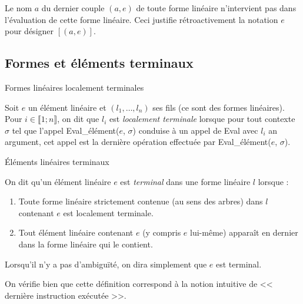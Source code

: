 \begin{remark}
    \label{justification_notation_forme_lineaire_simple}
    Le nom $a$ du dernier couple $(a, e)$ de toute forme linéaire
    n'intervient pas dans l'évaluation de cette forme linéaire. Ceci justifie
    rétroactivement la notation $e$ pour désigner $[(a, e)]$.
\end{remark}

\subsection{Formes et éléments terminaux}

\begin{definition}
    Formes linéaires localement terminales

    Soit $e$ un élément linéaire et $(l_1, \ldots, l_n)$ ses fils (ce
    sont des formes linéaires). Pour $i \in \lBrack 1; n \rBrack$, on dit que
    $l_i$ est \textit{localement terminale} lorsque pour tout contexte $\sigma$
    tel que l'appel Eval\_élément($e$, $\sigma$) conduise à un appel de Eval
    avec $l_i$ an argument, cet appel est la dernière opération effectuée par
    Eval\_élément($e$, $\sigma$).
\end{definition}

\begin{definition}
    Éléments linéaires terminaux

    On dit qu'un élément linéaire $e$ est \textit{terminal} dans une forme
    linéaire $l$ lorsque :
    \begin{enumerate}
        \item Toute forme linéaire strictement contenue (au sens des arbres)
              dans $l$ contenant $e$ est localement terminale.
        \item Tout élément linéaire contenant $e$ (y compris $e$
              lui-même) apparaît en dernier dans la forme linéaire qui le
              contient.
    \end{enumerate}
\end{definition}

\begin{remark}
    Lorsqu'il n'y a pas d'ambiguïté, on dira simplement que $e$ est terminal.
\end{remark}

\begin{remark}
    On vérifie bien que cette définition correspond à la notion intuitive
    de << dernière instruction exécutée >>.
\end{remark}


